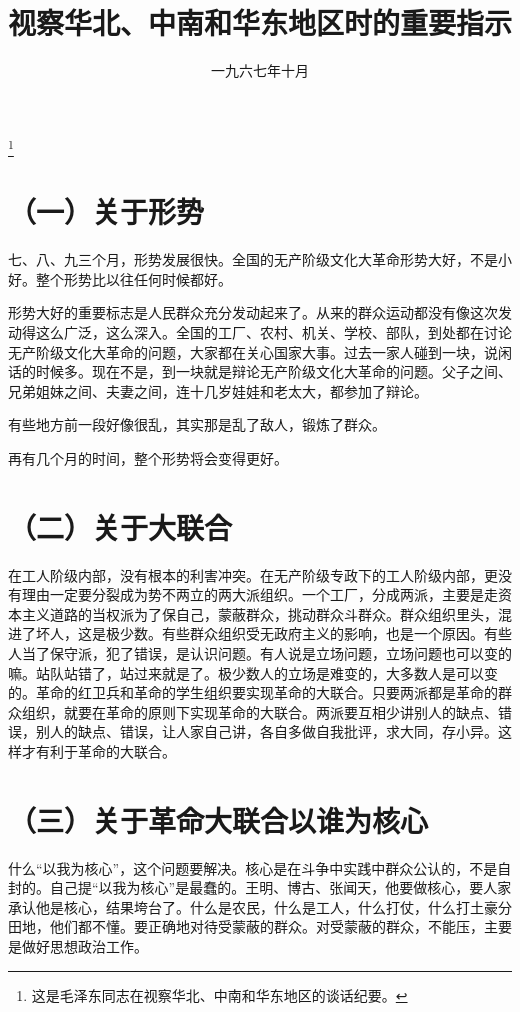 
\title{视察华北、中南和华东地区时的重要指示}
\date{一九六七年十月}
\thanks{这是毛泽东同志在视察华北、中南和华东地区的谈话纪要。}
\maketitle


\section{（一）关于形势}

七、八、九三个月，形势发展很快。全国的无产阶级文化大革命形势大好，不是小好。整个形势比以往任何时候都好。

形势大好的重要标志是人民群众充分发动起来了。从来的群众运动都没有像这次发动得这么广泛，这么深入。全国的工厂、农村、机关、学校、部队，到处都在讨论无产阶级文化大革命的问题，大家都在关心国家大事。过去一家人碰到一块，说闲话的时候多。现在不是，到一块就是辩论无产阶级文化大革命的问题。父子之间、兄弟姐妹之间、夫妻之间，连十几岁娃娃和老太大，都参加了辩论。

有些地方前一段好像很乱，其实那是乱了敌人，锻炼了群众。

再有几个月的时间，整个形势将会变得更好。

\section{（二）关于大联合}

在工人阶级内部，没有根本的利害冲突。在无产阶级专政下的工人阶级内部，更没有理由一定要分裂成为势不两立的两大派组织。一个工厂，分成两派，主要是走资本主义道路的当权派为了保自己，蒙蔽群众，挑动群众斗群众。群众组织里头，混进了坏人，这是极少数。有些群众组织受无政府主义的影响，也是一个原因。有些人当了保守派，犯了错误，是认识问题。有人说是立场问题，立场问题也可以变的嘛。站队站错了，站过来就是了。极少数人的立场是难变的，大多数人是可以变的。革命的红卫兵和革命的学生组织要实现革命的大联合。只要两派都是革命的群众组织，就要在革命的原则下实现革命的大联合。两派要互相少讲别人的缺点、错误，别人的缺点、错误，让人家自己讲，各自多做自我批评，求大同，存小异。这样才有利于革命的大联合。

\section{（三）关于革命大联合以谁为核心}

什么“以我为核心”，这个问题要解决。核心是在斗争中实践中群众公认的，不是自封的。自己提“以我为核心”是最蠢的。王明、博古、张闻天，他要做核心，要人家承认他是核心，结果垮台了。什么是农民，什么是工人，什么打仗，什么打土豪分田地，他们都不懂。要正确地对待受蒙蔽的群众。对受蒙蔽的群众，不能压，主要是做好思想政治工作。

